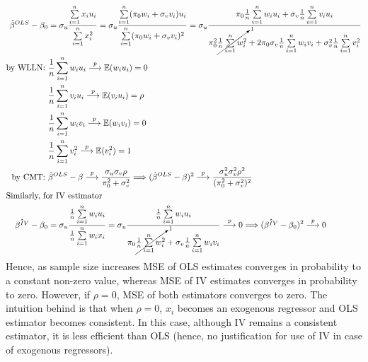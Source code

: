 \documentclass[]{article}
\begin{document}
\begin{equation}
	\begin{split}
		\hat{\beta}^{OLS} - \beta_0 &= \sigma_u\frac{\sum\limits_{i = 1}^nx_iu_i}{\sum\limits_{i = 1}^nx_i^2} = \sigma_u\frac{\sum\limits_{i = 1}^n(\pi_0w_i + \sigma_vv_i)u_i}{\sum\limits_{i = 1}^n(\pi_0w_i + \sigma_vv_i)^2} = \sigma_u\frac{\pi_0\frac{1}{n}\sum\limits_{i = 1}^nw_iu_i + \sigma_v\frac{1}{n}\sum\limits_{i = 1}^nv_iu_i}{\pi_0^2\cancelto{1}{\frac{1}{n}\sum\limits_{i = 1}^nw_i^2} + 2\pi_0\sigma_v\frac{1}{n}\sum\limits_{i = 1}^nw_iv_i + \sigma_v^2\frac{1}{n}\sum\limits_{i = 1}^nv_i^2}\nonumber \\
		\text{by WLLN: }&\frac{1}{n}\sum\limits_{i = 1}^nw_iu_i \overset{p}{\longrightarrow} \mathbb{E}(w_iu_i) = 0 \\
		&\frac{1}{n}\sum\limits_{i = 1}^nv_iu_i \overset{p}{\longrightarrow} \mathbb{E}(v_iu_i) = \rho \\
		&\frac{1}{n}\sum\limits_{i = 1}^nw_iv_i \overset{p}{\longrightarrow} \mathbb{E}(w_iv_i) = 0 \\
		&\frac{1}{n}\sum\limits_{i = 1}^nv_i^2 \overset{p}{\longrightarrow} \mathbb{E}(v_i^2) = 1 \\
		\text{by CMT: }& \hat{\beta}^{OLS} - \beta \overset{p}{\longrightarrow} \frac{\sigma_u\sigma_v\rho}{\pi_0^2 + \sigma_v^2} \Longrightarrow (\hat{\beta}^{OLS} - \beta)^2 \overset{p}{\longrightarrow} \frac{\sigma_u^2\sigma_v^2\rho^2}{(\pi_0^2 + \sigma_v^2)^2}\\
		\intertext{Similarly, for IV estimator}
		\hat{\beta^{IV}} - \beta_0 &= \sigma_u\frac{\frac{1}{n}\sum\limits_{i = 1}^nw_iu_i}{\frac{1}{n}\sum\limits_{i = 1}^nw_ix_i} = \sigma_u\frac{\frac{1}{n}\sum\limits_{i = 1}^nw_iu_i}{\pi_0\cancelto{1}{\frac{1}{n}\sum\limits_{i = 1}^nw_i^2} + \sigma_v\frac{1}{n}\sum\limits_{i = 1}^nw_iv_i} \overset{p}{\longrightarrow} 0 \Longrightarrow (\hat{\beta^{IV}} - \beta_0)^2 \overset{p}{\longrightarrow} 0
	\end{split}
\end{equation}
Hence, as sample size increases MSE of OLS estimates converges in probability to a constant non-zero value, whereas MSE of IV estimates converges in probability to zero. However, if $\rho = 0$, MSE of both estimators converges to zero. The intuition behind is that when $\rho = 0$, $x_i$ becomes an exogenous regressor and OLS estimator becomes consistent. In this case, although IV remains a consistent estimator, it is less efficient than OLS (hence, no justification for use of IV in case of exogenous regressors).
\end{document}
